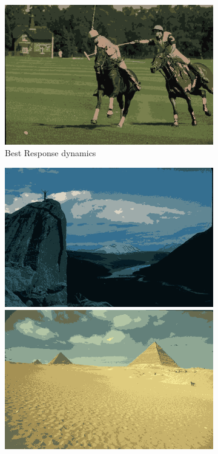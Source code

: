\documentclass[11pt,a4paper]{article}
\begin{document}
\begin{figure}
\begin{subfigure}[b]{0.3\textwidth}
        \includegraphics[width=\textwidth]{figures/methods/fp/361010_avg.png}
        \caption{Best Response dynamics}
    \end{subfigure}
    \hfill
    \begin{subfigure}[b]{0.3\textwidth}
        \centering
        \includegraphics[width=\textwidth]{figures/methods/rd/14037_avg.png}
        \includegraphics[width=\textwidth]{figures/methods/rd/260058_avg.png}

\end{subfigure}
\end{figure}
\end{document}
